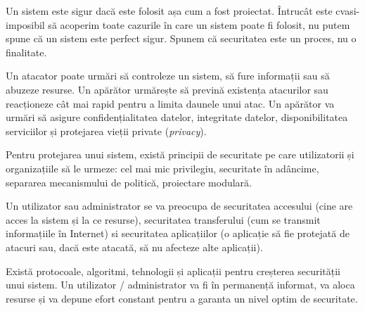 Un sistem este sigur dacă este folosit așa cum a fost proiectat.
Întrucât este cvasi-imposibil să acoperim toate cazurile în care un sistem poate fi folosit, nu putem spune că un sistem este perfect sigur.
Spunem că securitatea este un proces, nu o finalitate.

Un atacator poate urmări să controleze un sistem, să fure informații sau să abuzeze resurse.
Un apărător urmărește să prevină existența atacurilor sau reacționeze cât mai rapid pentru a limita daunele unui atac.
Un apărător va urmări să asigure confidențialitatea datelor, integritate datelor, disponibilitatea serviciilor și protejarea vieții private (\textit{privacy}).

Pentru protejarea unui sistem, există principii de securitate pe care utilizatorii și organizațiile să le urmeze: cel mai mic privilegiu, securitate în adâncime, separarea mecanismului de politică, proiectare modulară.

Un utilizator sau administrator se va preocupa de securitatea accesului (cine are acces la sistem și la ce resurse), securitatea transferului (cum se transmit informațiile în Internet) si securitatea aplicațiilor (o aplicație să fie protejată de atacuri sau, dacă este atacată, să nu afecteze alte aplicații).

Există protocoale, algoritmi, tehnologii și aplicații pentru creșterea securității unui sistem.
Un utilizator / administrator va fi în permanență informat, va aloca resurse și va depune efort constant pentru a garanta un nivel optim de securitate.

